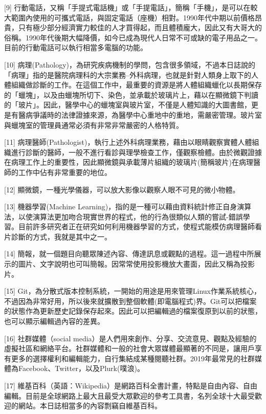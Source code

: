 \documentclass[
]{article}
\begin{document}
{[}9{]}
行動電話，又稱「手提式電話機」或「手提電話」，簡稱「手機」，是可以在較大範圍內使用的可攜式電話，與固定電話（座機）相對。1990年代中期以前價格昂貴，只有極少部分經濟實力較佳的人才買得起，而且體積龐大，因此又有大哥大的俗稱。1990年代後期大幅降價，如今已成為現代人日常不可或缺的電子用品之一。目前的行動電話可以執行相當多電腦的功能。

{[}10{]}
病理(Pathology)，為研究疾病機制的學問，包含很多領域，不過本日誌說的「病理」指的是醫院病理科的大宗業務--外科病理，也就是針對人類身上取下的人體組織做診斷的工作。在這個工作中，最重要的資源是將人體組織蠟化以長期保存的「蠟塊」，以及由蠟塊所切下、染色，並承載於玻璃片上，藉以在顯微鏡下判讀的「玻片」。因此，醫學中心的蠟塊室與玻片室，不僅是人體知識的大圖書館，更是有醫病爭議時的法律證據來源，為醫學中心重地中的重地，需嚴密管理。玻片室與蠟塊室的管理員通常必須有非常非常嚴密的人格特質。

{[}11{]}
病理醫師(Pathologist)，執行上述外科病理業務，藉由以眼睛觀察實體人體組織進行診斷的醫師，一般不進行看診與理學檢查工作，僅觀察檢體。由於微觀證據在病理工作上的重要性，因此顯微鏡與承載薄片組織的玻璃片(簡稱玻片)在病理醫師的工作中佔有非常重要的地位。

{[}12{]} 顯微鏡，一種光學儀器，可以放大影像以觀察人眼不可見的微小物體。

{[}13{]} 機器學習(Machine
Learning)，指的是一種可以藉由資料統計修正自身演算法，以使演算法更加吻合現實世界的程式，他的行為很類似人類的嘗試-錯誤學習。目前許多研究者正在研究如何利用機器學習的方式，使程式能模仿病理醫師看片診斷的方式，我就是其中之一。

{[}14{]}
簡報，就一個題目向聽眾陳述內容、傳達訊息或觀點的過程。這一過程中所展示的圖片、文字說明也可叫簡報。因常常使用投影機放大畫面，因此又稱為投影片。

{[}15{]}
Git，為分散式版本控制系統，一開始的用途是用來管理Linux作業系統核心，不過因為非常好用，所以後來就擴散到整個軟體(即電腦程式)界。Git可以把檔案的狀態作為更新歷史記錄保存起來。因此可以把編輯過的檔案復原到以前的狀態，也可以顯示編輯過內容的差異。

{[}16{]} 社群媒體（social
media）是人們用來創作、分享、交流意見、觀點及經驗的虛擬社區和網絡平台。社群媒體和一般的社會大眾媒體最顯著的不同是，讓用戶享有更多的選擇權利和編輯能力，自行集結成某種閱聽社群。2019年最常見的社群媒體為Facebook、Twitter，以及Plurk(噗浪)。

{[}17{]}
維基百科（英語：Wikipedia）是網路百科全書計畫，特點是自由內容、自由編輯。目前是全球網路上最大且最受大眾歡迎的參考工具書，名列全球十大最受歡迎的網站。本日誌相當多的內容剽竊自維基百科。
\end{document}
